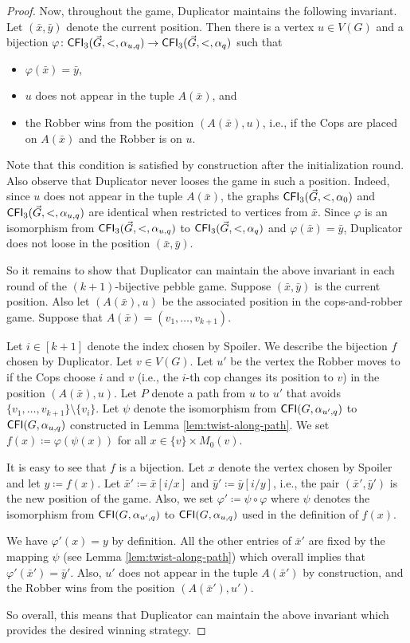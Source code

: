 \documentclass{theoretics}
\newcommand{\CFI}{{\sf CFI}}
\begin{document}
\begin{proof}
 Now, throughout the game, Duplicator maintains the following invariant.
 Let $(\bar x,\bar y)$ denote the current position.
 Then there is a vertex $u \in V(G)$ and a bijection $\varphi\colon \CFI_3(\vec{G},<,\alpha_{u,q}) \to \CFI_3(\vec{G},<,\alpha_{q})$ such that
 \begin{itemize}
  \item $\varphi(\bar x) = \bar y$,
  \item $u$ does not appear in the tuple $A(\bar x)$, and
  \item the Robber wins from the position $(A(\bar x), u)$, i.e., if the Cops are placed on $A(\bar x)$ and the Robber is on $u$.
 \end{itemize}
 Note that this condition is satisfied by construction after the initialization round.
 Also observe that Duplicator never looses the game in such a position.
 Indeed, since $u$ does not appear in the tuple $A(\bar x)$, the graphs $\CFI_3(\vec{G},<,\alpha_0)$ and $\CFI_3(\vec{G},<,\alpha_{u,q})$ are identical when restricted to vertices from $\bar x$.
 Since $\varphi$ is an isomorphism from $\CFI_3(\vec{G},<,\alpha_{u,q})$ to $\CFI_3(\vec{G},<,\alpha_{q})$ and $\varphi(\bar x) = \bar y$, Duplicator does not loose in the position $(\bar x,\bar y)$.

 So it remains to show that Duplicator can maintain the above invariant in each round of the $(k+1)$-bijective pebble game.
 Suppose $(\bar x,\bar y)$ is the current position.
 Also let $(A(\bar x), u)$ be the associated position in the cops-and-robber game.
 Suppose that $A(\bar x) = (v_1,\dots,v_{k+1})$.

 Let $i \in [k+1]$ denote the index chosen by Spoiler.
 We describe the bijection $f$ chosen by Duplicator.
 Let $v \in V(G)$.
 Let $u'$ be the vertex the Robber moves to if the Cops choose $i$ and $v$ (i.e., the $i$-th cop changes its position to $v$) in the position $(A(\bar x),u)$.
 Let $P$ denote a path from $u$ to $u'$ that avoids $\{v_1,\dots,v_{k+1}\} \setminus \{v_i\}$.
 Let $\psi$ denote the isomorphism from $\CFI(G,\alpha_{u',q})$ to $\CFI(G,\alpha_{u,q})$ constructed in Lemma \ref{lem:twist-along-path}.
 We set $f(x) \coloneqq \varphi(\psi(x))$ for all $x \in \{v\} \times M_{0}(v)$.

 It is easy to see that $f$ is a bijection.
 Let $x$ denote the vertex chosen by Spoiler and let $y \coloneqq f(x)$.
 Let $\bar x' \coloneqq \bar x[i/x]$ and $\bar y' \coloneqq \bar y[i/y]$, i.e., the pair $(\bar x',\bar y')$ is the new position of the game.
 Also, we set $\varphi' \coloneqq \psi \circ \varphi$ where $\psi$ denotes the isomorphism from $\CFI(G,\alpha_{u',q})$ to $\CFI(G,\alpha_{u,q})$ used in the definition of $f(x)$.

 We have $\varphi'(x) = y$ by definition.
 All the other entries of $\bar x'$ are fixed by the mapping $\psi$ (see Lemma \ref{lem:twist-along-path}) which overall implies that $\varphi'(\bar x') = \bar y'$.
 Also, $u'$ does not appear in the tuple $A(\bar x')$ by construction, and the Robber wins from the position $(A(\bar x'), u')$.

 So overall, this means that Duplicator can maintain the above invariant which provides the desired winning strategy.
\end{proof}
\end{document}
